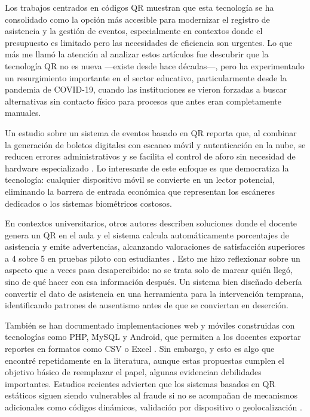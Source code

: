 Los trabajos centrados en códigos QR muestran que esta tecnología se ha consolidado como la opción más accesible para modernizar el registro de asistencia y la gestión de eventos, especialmente en contextos donde el presupuesto es limitado pero las necesidades de eficiencia son urgentes. Lo que más me llamó la atención al analizar estos artículos fue descubrir que la tecnología QR no es nueva —existe desde hace décadas—, pero ha experimentado un resurgimiento importante en el sector educativo, particularmente desde la pandemia de COVID-19, cuando las instituciones se vieron forzadas a buscar alternativas sin contacto físico para procesos que antes eran completamente manuales.

Un estudio sobre un sistema de eventos basado en QR reporta que, al combinar la generación de boletos digitales con escaneo móvil y autenticación en la nube, se reducen errores administrativos y se facilita el control de aforo sin necesidad de hardware especializado \cite{rajendran2021qr_event}. Lo interesante de este enfoque es que democratiza la tecnología: cualquier dispositivo móvil se convierte en un lector potencial, eliminando la barrera de entrada económica que representan los escáneres dedicados o los sistemas biométricos costosos.

En contextos universitarios, otros autores describen soluciones donde el docente genera un QR en el aula y el sistema calcula automáticamente porcentajes de asistencia y emite advertencias, alcanzando valoraciones de satisfacción superiores a 4 sobre 5 en pruebas piloto con estudiantes \cite{hamzah2021qr_uitm}. Esto me hizo reflexionar sobre un aspecto que a veces pasa desapercibido: no se trata solo de marcar quién llegó, sino de qué hacer con esa información después. Un sistema bien diseñado debería convertir el dato de asistencia en una herramienta para la intervención temprana, identificando patrones de ausentismo antes de que se conviertan en deserción.

También se han documentado implementaciones web y móviles construidas con tecnologías como PHP, MySQL y Android, que permiten a los docentes exportar reportes en formatos como CSV o Excel \cite{deshmukh_qr_attendance_india}. Sin embargo, y esto es algo que encontré repetidamente en la literatura, aunque estas propuestas cumplen el objetivo básico de reemplazar el papel, algunas evidencian debilidades importantes. Estudios recientes advierten que los sistemas basados en QR estáticos siguen siendo vulnerables al fraude si no se acompañan de mecanismos adicionales como códigos dinámicos, validación por dispositivo o geolocalización \cite{hendrawan2025qr_slr_education}.

